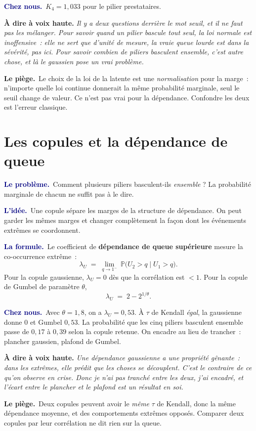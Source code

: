 \documentclass[11pt,a4paper]{article}
\newcommand{\lequoi}[1]{\smallskip\noindent\textcolor{navy}{\textbf{Le problème.}}\ #1\par}
\newcommand{\lidee}[1]{\smallskip\noindent\textcolor{navy}{\textbf{L'idée.}}\ #1\par}
\newcommand{\laformule}[1]{\smallskip\noindent\textcolor{navy}{\textbf{La formule.}}\ #1\par}
\newcommand{\cheznous}[1]{\smallskip\noindent\textcolor{navy}{\textbf{Chez nous.}}\ #1\par}
\newcommand{\lepiege}[1]{\smallskip\noindent\textcolor{accent}{\textbf{Le piège.}}\ #1\par}
\newcommand{\laphrase}[1]{\begin{phrasebox}\textbf{À dire à voix haute.} \emph{#1}\end{phrasebox}}
\begin{document}
\cheznous{$K_4 = 1{,}033$ pour le pilier prestataires.}

\laphrase{Il y a deux questions derrière le mot seuil, et il ne faut pas les mélanger. Pour
savoir \emph{quand un pilier bascule tout seul}, la loi normale est inoffensive~: elle ne
sert que d'unité de mesure, la vraie queue lourde est dans la sévérité, pas ici. Pour savoir
\emph{combien de piliers basculent ensemble}, c'est autre chose, et là le gaussien pose un
vrai problème.}

\lepiege{Le choix de la loi de la latente est une \emph{normalisation} pour la marge~:
n'importe quelle loi continue donnerait la même probabilité marginale, seul le seuil change
de valeur. Ce n'est pas vrai pour la dépendance. Confondre les deux est l'erreur classique.}

\section{Les copules et la dépendance de queue}

\lequoi{Comment plusieurs piliers basculent-ils \emph{ensemble} ? La probabilité marginale
de chacun ne suffit pas à le dire.}

\lidee{Une copule sépare les marges de la structure de dépendance. On peut garder les mêmes
marges et changer complètement la façon dont les événements extrêmes se coordonnent.}

\laformule{Le coefficient de \textbf{dépendance de queue supérieure} mesure la
co-occurrence extrême~:
\[
  \lambda_U \;=\; \lim_{q\to1^-}\ \mathbb{P}\bigl(U_2>q \mid U_1>q\bigr).
\]
Pour la copule gaussienne, $\lambda_U = 0$ dès que la corrélation est $<1$. Pour la copule
de Gumbel de paramètre $\theta$,
\[
  \lambda_U \;=\; 2-2^{1/\theta}.
\]}

\cheznous{Avec $\theta=1{,}8$, on a $\lambda_U = 0{,}53$. À $\tau$ de Kendall \emph{égal},
la gaussienne donne $0$ et Gumbel $0{,}53$. La probabilité que les cinq piliers basculent
ensemble passe de $0{,}17$ à $0{,}39$ selon la copule retenue. On encadre au lieu de
trancher~: plancher gaussien, plafond de Gumbel.}

\laphrase{Une dépendance gaussienne a une propriété gênante~: dans les extrêmes, elle prédit
que les choses se \emph{découplent}. C'est le contraire de ce qu'on observe en crise. Donc
je n'ai pas tranché entre les deux, j'ai encadré, et l'écart entre le plancher et le plafond
est un résultat en soi.}

\lepiege{Deux copules peuvent avoir le \emph{même} $\tau$ de Kendall, donc la même
dépendance \og moyenne\fg{}, et des comportements extrêmes opposés. Comparer deux copules par
leur corrélation ne dit rien sur la queue.}
\end{document}
